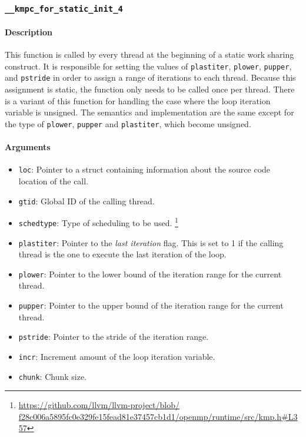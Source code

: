 \subsubsection{\texttt{\_\_kmpc\_for\_static\_init\_4}}

\paragraph{Description} This function is called by every thread at the beginning of a static work
sharing construct. It is responsible for setting the values of \texttt{plastiter}, \texttt{plower},
\texttt{pupper}, and \texttt{pstride} in order to assign a range of iterations to each thread.
Because this assignment is static, the function only needs to be called once per thread. There is a
variant of this function for handling the case where the loop iteration variable is unsigned. The
semantics and implementation are the same except for the type of \texttt{plower}, \texttt{pupper}
and \texttt{plastiter}, which become unsigned.

\paragraph{Arguments}
\begin{itemize}
	\item \texttt{loc}: Pointer to a struct containing information about the source code location
	      of the call.
	\item \texttt{gtid}: Global ID of the calling thread.
	\item \texttt{schedtype}: Type of scheduling to be used.
	      \footnote{\url{
			      https://github.com/llvm/llvm-project/blob/
			      f28c006a5895fc0e329fe15fead81e37457cb1d1/openmp/runtime/src/kmp.h\#L357}}
	\item \texttt{plastiter}: Pointer to the \emph{last iteration} flag. This is set to 1 if the
	      calling thread is the one to execute the last iteration of the loop.
	\item \texttt{plower}: Pointer to the lower bound of the iteration range for the current thread.
	\item \texttt{pupper}: Pointer to the upper bound of the iteration range for the current thread.
	\item \texttt{pstride}: Pointer to the stride of the iteration range.
	\item \texttt{incr}: Increment amount of the loop iteration variable.
	\item \texttt{chunk}: Chunk size.
\end{itemize}

